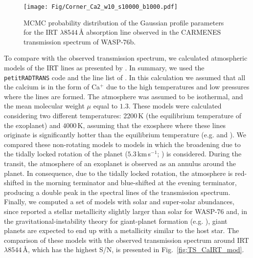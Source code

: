 \documentclass{aa}
\begin{document}
\begin{figure}[]
\centering
\texttt{[image: Fig/Corner\_Ca2\_w10\_s10000\_b1000.pdf]}
\caption{MCMC probability distribution of the Gaussian profile parameters for the  IRT $\lambda 8544$\,{\AA} absorption line observed in the CARMENES transmission spectrum of WASP-76b.}
\label{fig:MCMC_Ca2}
\end{figure}




To compare with the observed transmission spectrum, we calculated atmospheric models of the  IRT lines as presented by \citet{Yan2019}. In summary, we used the {\tt petitRADTRANS} code \citep{petitRADTRANS2019} and the line list of \citet{Kurucz2011}. In this calculation we assumed that all the calcium is in the form of Ca$^+$ due to the high temperatures and low pressures where the  lines are formed. The atmosphere was assumed to be isothermal, and the mean molecular weight $\mu$ equal to $1.3$. These models were calculated considering two different temperatures: 2200\,K (the equilibrium temperature of the exoplanet) and $4000$\,K, assuming that the exosphere where these lines originate is significantly hotter than the equilibrium temperature (e.g. \citealt{Yan2019} and \citealt{Turner2020}). 
We compared these non-rotating models to models in which the broadening due to the tidally locked rotation of the planet ($5.3$\,km\,s$^{-1}$; \citealt{Ehrenreich2020}) is considered. During the transit, the atmosphere of an exoplanet is observed as an annulus around the planet. In consequence, due to the tidally locked rotation, the atmosphere is red-shifted in the morning terminator and blue-shifted at the evening terminator, producing a double peak in the spectral lines of the transmission spectrum.
Finally, we computed a set of models with solar and super-solar abundances, since \citet{Tabernero2020} reported a stellar metallicity slightly larger than solar for WASP-76 and, in the gravitational-instability theory for giant-planet formation (e.g. \citealt{Boss1997}), giant planets are expected to end up with a metallicity similar to the host star. The comparison of these models with the observed transmission spectrum around  IRT $\lambda 8544$\,{\AA}, which has the highest S/N, is presented in Fig.~\ref{fig:TS_CaIRT_mod}. 
\end{document}
